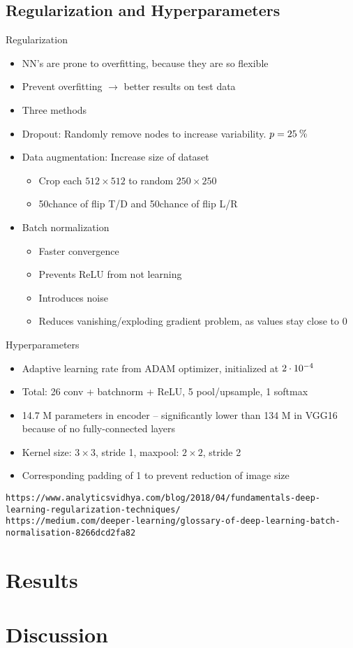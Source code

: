 \documentclass[12pt,fleqn]{article}
\begin{document}
\subsection{Regularization and Hyperparameters}
Regularization
\begin{itemize}
	\item NN's are prone to overfitting, because they are so flexible
	\item Prevent overfitting $ \to $ better results on test data
	\item Three methods
	\item Dropout: Randomly remove nodes to increase variability. $ p=25\:\text{\%{}} $
	\item Data augmentation: Increase size of dataset
	\begin{itemize}
		\item Crop each $ 512\times 512 $ to random $ 250\times 250 $
		\item 50\pro chance of flip T/D and 50\pro chance of flip L/R
	\end{itemize}
	\item Batch normalization
	\begin{itemize}
		\item Faster convergence
		\item Prevents ReLU from not learning
		\item Introduces noise
		\item Reduces vanishing/exploding gradient problem, as values stay close to 0
	\end{itemize}
\end{itemize}
Hyperparameters
\begin{itemize}
	\item Adaptive learning rate from ADAM optimizer, initialized at $ 2\cdot10^{-4} $
	\item Total: 26 conv + batchnorm + ReLU, 5 pool/upsample, 1 softmax
	\item 14.7 M parameters in encoder -- significantly lower than 134 M in VGG16 because of no fully-connected layers
	\item Kernel size: $ 3\times 3 $, stride 1, maxpool: $ 2\times 2 $, stride 2
	\item Corresponding padding of 1 to prevent reduction of image size
\end{itemize}
\texttt{https://www.analyticsvidhya.com/blog/2018/04/fundamentals-deep-learning-regularization-techniques/}\\
\texttt{https://medium.com/deeper-learning/glossary-of-deep-learning-batch-normalisation-8266dcd2fa82}

\section{Results}

\section{Discussion}
\end{document}
